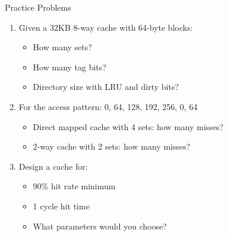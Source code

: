 \documentclass[aspectratio=169,12pt]{beamer}
\begin{document}
\begin{frame}{Practice Problems}
\begin{enumerate}
    \item Given a 32KB 8-way cache with 64-byte blocks:
    \begin{itemize}
        \item How many sets?
        \item How many tag bits?
        \item Directory size with LRU and dirty bits?
    \end{itemize}
    
    \item For the access pattern: 0, 64, 128, 192, 256, 0, 64
    \begin{itemize}
        \item Direct mapped cache with 4 sets: how many misses?
        \item 2-way cache with 2 sets: how many misses?
    \end{itemize}
    
    \item Design a cache for:
    \begin{itemize}
        \item 90\% hit rate minimum
        \item 1 cycle hit time
        \item What parameters would you choose?
    \end{itemize}
\end{enumerate}
\end{frame}
\end{document}
